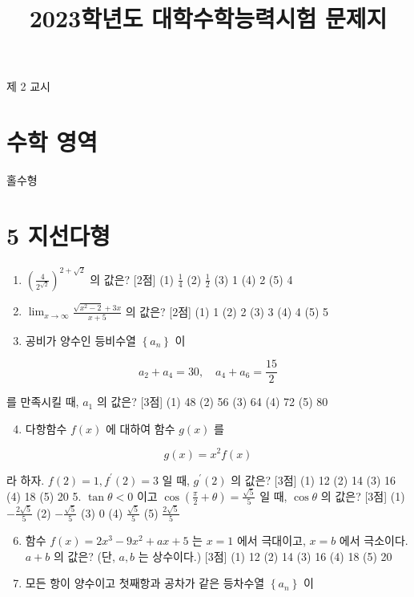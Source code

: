 \documentclass[10pt]{article}
\title{2023학년도 대학수학능력시험 문제지 }
\author{}
\date{}
\begin{document}
\maketitle
제 2 교시

\section{수학 영역}
홀수형

\section{5 지선다형}
\begin{enumerate}
  \item $\left(\frac{4}{2^{\sqrt{2}}}\right)^{2+\sqrt{2}}$ 의 값은? [2점]
(1) $\frac{1}{4}$
(2) $\frac{1}{2}$
(3) 1
(4) 2
(5) 4

  \item $\lim _{x \rightarrow \infty} \frac{\sqrt{x^{2}-2}+3 x}{x+5}$ 의 값은? [2점]
(1) 1
(2) 2
(3) 3
(4) 4
(5) 5

  \item 공비가 양수인 등비수열 $\left\{a_{n}\right\}$ 이

\end{enumerate}

$$
a_{2}+a_{4}=30, \quad a_{4}+a_{6}=\frac{15}{2}
$$

를 만족시킬 때, $a_{1}$ 의 값은? [3점]
(1) 48
(2) 56
(3) 64
(4) 72
(5) 80

\begin{enumerate}
  \setcounter{enumi}{3}
  \item 다항함수 $f(x)$ 에 대하여 함수 $g(x)$ 를
\end{enumerate}

$$
g(x)=x^{2} f(x)
$$

라 하자. $f(2)=1, f^{\prime}(2)=3$ 일 때, $g^{\prime}(2)$ 의 값은? [3점]
(1) 12
(2) 14
(3) 16
(4) 18
(5) 20 5. $\tan \theta<0$ 이고 $\cos \left(\frac{\pi}{2}+\theta\right)=\frac{\sqrt{5}}{5}$ 일 때, $\cos \theta$ 의 값은? [3점]
(1) $-\frac{2 \sqrt{5}}{5}$
(2) $-\frac{\sqrt{5}}{5}$
(3) 0
(4) $\frac{\sqrt{5}}{5}$
(5) $\frac{2 \sqrt{5}}{5}$

\begin{enumerate}
  \setcounter{enumi}{5}
  \item 함수 $f(x)=2 x^{3}-9 x^{2}+a x+5$ 는 $x=1$ 에서 극대이고, $x=b$ 에서 극소이다. $a+b$ 의 값은? (단, $a, b$ 는 상수이다.) [3점]
(1) 12
(2) 14
(3) 16
(4) 18
(5) 20

  \item 모든 항이 양수이고 첫째항과 공차가 같은 등차수열 $\left\{a_{n}\right\}$ 이

\end{enumerate}
\end{document}
